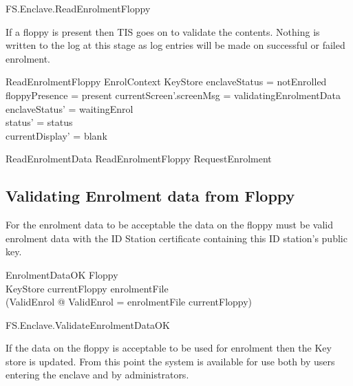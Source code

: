 \begin{traceunit}{FS.Enclave.ReadEnrolmentFloppy}
\end{traceunit}

If a floppy is present then TIS goes on to validate the
contents. Nothing is written to the log at this stage as log entries
will be made on successful or failed enrolment.

\begin{schema}{ReadEnrolmentFloppy}
        EnrolContext
\also
        \Xi KeyStore
\where
        enclaveStatus = notEnrolled
\\      floppyPresence = present
\also
        currentScreen'.screenMsg = validatingEnrolmentData 
\also
        enclaveStatus' = waitingEnrol     
\\      status' = status
\\      currentDisplay' = blank                         
\end{schema}

\begin{zed}
        ReadEnrolmentData  ReadEnrolmentFloppy \lor RequestEnrolment
\end{zed}

\subsection{Validating Enrolment data from Floppy}

For the enrolment data to be acceptable the data on the floppy must be
valid enrolment data with the ID Station certificate containing this
ID station's public key. 

\begin{schema}{EnrolmentDataOK}
        Floppy
\\      KeyStore
\where
        currentFloppy \in \ran enrolmentFile
\\      (\exists ValidEnrol @ \theta ValidEnrol = enrolmentFile \inv
currentFloppy)
\end{schema}

\begin{traceunit}{FS.Enclave.ValidateEnrolmentDataOK}
\end{traceunit}


If the data on the floppy is acceptable to be used for enrolment then
the Key store is updated. From this point the system is available for
use both by users entering the enclave and by administrators.

